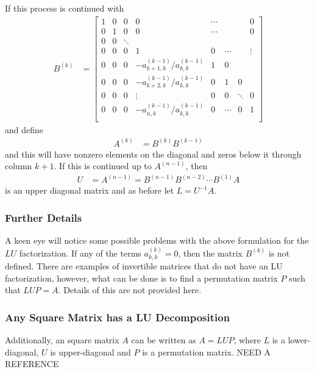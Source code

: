 If this process is continued with 
%
\begin{align*}
B^{(k)} & = \begin{bmatrix}
1 & 0 & 0 & 0 & \cdots & & & 0  \\
0 & 1 & 0 & 0 & \cdots & & & 0  \\
0 & 0 & \ddots \\
0 & 0 & 0 & 1 & 0 & \cdots & & \vdots \\
0 & 0 & 0 & -a^{(k-1)}_{k+1,k}/a^{(k-1)}_{k,k} & 1 & 0 \\
0 & 0 & 0 & -a^{(k-1)}_{k+2,k}/a^{(k-1)}_{k,k} & 0 & 1 & 0 \\
0 & 0 & 0 & \vdots & 0 & 0 & \ddots & 0 \\
0 & 0 & 0 & -a^{(k-1)}_{n,k}/a^{(k-1)}_{k,k} & 0 & \cdots & 0 & 1 \\
\end{bmatrix}
\end{align*}
and define
\begin{align*}
A^{(k)} & = B^{(k)} B^{(k-1)} 
\end{align*}
and this will have nonzero elements on the diagonal and zeros below it through column $k+1$.  
If this is continued up to $A^{(n-1)}$, then 
\begin{align*}
U & = A^{(n-1)} = B^{(n-1)}B^{(n-2)} \cdots B^{(1)} A
\end{align*}
is an upper diagonal matrix and as before let $L = U^{-1} A$. 

\subsubsection{Further Details}

A keen eye will notice some possible problems with the above formulation for the $LU$ factorization.  If any of the terms $a^{(k)}_{k,k} = 0$, then the matrix $B^{(k)}$ is not defined.   There are examples of invertible matrices that do not have an LU factorization, however, what can be done is to find a permutation matrix $P$ such that $LUP=A$.  Details of this are not provided here. 

\subsubsection{Any Square Matrix has a LU Decomposition}

Additionally, an square matrix $A$ can be written as $A=LUP$, where $L$ is a lower-diagonal, $U$ is upper-diagonal and $P$ is a permutation matrix.  {\color{red} NEED A REFERENCE} 

